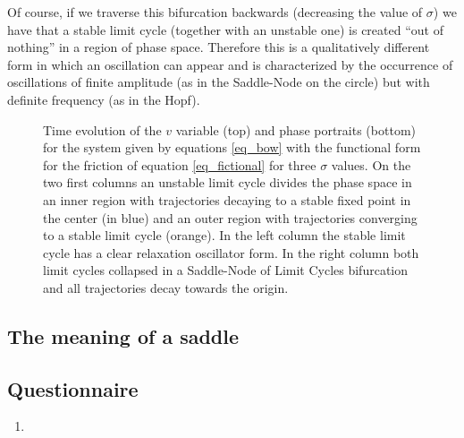 \documentclass{article}
\begin{document}
Of course, if we traverse this bifurcation backwards (decreasing the value of $\sigma$) we have that a stable limit cycle (together with an unstable one) is created “out of nothing” in a region of phase space. 
Therefore this is a qualitatively different form in which an oscillation can appear and is characterized by the occurrence of oscillations of finite amplitude (as in the Saddle-Node on the circle) but with definite frequency (as in the Hopf).




\begin{figure}[h]
    \centering
    \caption{Time evolution of the $v$ variable (top) and phase portraits (bottom) for the system given by equations \ref{eq_bow} with the functional form for the friction of equation \ref{eq_fictional} for three $\sigma$ values. On the two first columns an unstable limit cycle divides the phase space in an inner region with trajectories decaying to a stable fixed point in the center (in blue) and an outer region with trajectories converging to a stable limit cycle (orange). In the left column the stable limit cycle has a clear relaxation oscillator form. In the right column both limit cycles collapsed in a Saddle-Node of Limit Cycles bifurcation and all trajectories decay towards the origin.} 
    \label{fig_friction2}
    
\end{figure}

\subsection{The meaning of a saddle}

\subsection{Questionnaire}
\begin{enumerate}
\item 
\end{enumerate}
\end{document}
